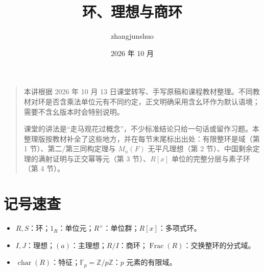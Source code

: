 \documentclass[UTF8,a4paper,11pt]{ctexart}
\title{环、理想与商环}\author{zhangjunshuo}\date{2026 年 10 月}
\begin{document}
\maketitle
\begin{quote}
本讲根据 2026 年 10 月 13 日课堂转写、手写原稿和课程教材整理。不同教材对环是否含乘法单位元有不同约定，正文明确采用含幺环作为默认语境；需要不含幺版本时会特别说明。

课堂的讲法是“走马观花过概念”，不少标准结论只给一句话或留作习题。本整理版按教材补全了这些地方，并在每节末尾标出出处：有限整环是域（第 1 节）、第二/第三同构定理与 $M_n(F)$ 无平凡理想（第 2 节）、中国剩余定理的满射证明与正交幂等元（第 3 节）、$R[x]$ 单位的完整分层与素子环（第 4 节）。
\end{quote}
\tableofcontents\clearpage

\section*{记号速查}
\begin{itemize}
\item $R,S$：环；$1_R$：单位元；$R^\times$：单位群；$R[x]$：多项式环。
\item $I,J$：理想；$(a)$：主理想；$R/I$：商环；$\operatorname{Frac}(R)$：交换整环的分式域。
\item $\operatorname{char}(R)$：特征；$\mathbb F_p=\mathbb Z/p\mathbb Z$：$p$ 元素的有限域。
\end{itemize}
\end{document}
